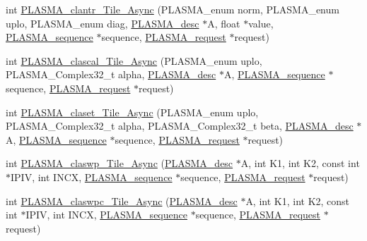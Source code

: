 \begin{DoxyCompactItemize}
\item 
int \hyperlink{group__PLASMA__Complex32__t__Tile__Async_gafc8c8736dbeea863cc6bfa87bec32049_gafc8c8736dbeea863cc6bfa87bec32049}{P\+L\+A\+S\+M\+A\+\_\+clantr\+\_\+\+Tile\+\_\+\+Async} (P\+L\+A\+S\+M\+A\+\_\+enum norm, P\+L\+A\+S\+M\+A\+\_\+enum uplo, P\+L\+A\+S\+M\+A\+\_\+enum diag, \hyperlink{structplasma__desc__t}{P\+L\+A\+S\+M\+A\+\_\+desc} $\ast$A, float $\ast$value, \hyperlink{structplasma__sequence__t}{P\+L\+A\+S\+M\+A\+\_\+sequence} $\ast$sequence, \hyperlink{structplasma__request__t}{P\+L\+A\+S\+M\+A\+\_\+request} $\ast$request)
\item 
int \hyperlink{group__PLASMA__Complex32__t__Tile__Async_ga72442cec5ef58786d99fad33fbbe789e_ga72442cec5ef58786d99fad33fbbe789e}{P\+L\+A\+S\+M\+A\+\_\+clascal\+\_\+\+Tile\+\_\+\+Async} (P\+L\+A\+S\+M\+A\+\_\+enum uplo, P\+L\+A\+S\+M\+A\+\_\+\+Complex32\+\_\+t alpha, \hyperlink{structplasma__desc__t}{P\+L\+A\+S\+M\+A\+\_\+desc} $\ast$A, \hyperlink{structplasma__sequence__t}{P\+L\+A\+S\+M\+A\+\_\+sequence} $\ast$sequence, \hyperlink{structplasma__request__t}{P\+L\+A\+S\+M\+A\+\_\+request} $\ast$request)
\item 
int \hyperlink{group__PLASMA__Complex32__t__Tile__Async_ga37fdc0526d96baa410a7346b11e383c6_ga37fdc0526d96baa410a7346b11e383c6}{P\+L\+A\+S\+M\+A\+\_\+claset\+\_\+\+Tile\+\_\+\+Async} (P\+L\+A\+S\+M\+A\+\_\+enum uplo, P\+L\+A\+S\+M\+A\+\_\+\+Complex32\+\_\+t alpha, P\+L\+A\+S\+M\+A\+\_\+\+Complex32\+\_\+t beta, \hyperlink{structplasma__desc__t}{P\+L\+A\+S\+M\+A\+\_\+desc} $\ast$A, \hyperlink{structplasma__sequence__t}{P\+L\+A\+S\+M\+A\+\_\+sequence} $\ast$sequence, \hyperlink{structplasma__request__t}{P\+L\+A\+S\+M\+A\+\_\+request} $\ast$request)
\item 
int \hyperlink{group__PLASMA__Complex32__t__Tile__Async_ga5ff56ce40aa2f76b6bdb382c723d8c17_ga5ff56ce40aa2f76b6bdb382c723d8c17}{P\+L\+A\+S\+M\+A\+\_\+claswp\+\_\+\+Tile\+\_\+\+Async} (\hyperlink{structplasma__desc__t}{P\+L\+A\+S\+M\+A\+\_\+desc} $\ast$A, int K1, int K2, const int $\ast$I\+P\+I\+V, int I\+N\+C\+X, \hyperlink{structplasma__sequence__t}{P\+L\+A\+S\+M\+A\+\_\+sequence} $\ast$sequence, \hyperlink{structplasma__request__t}{P\+L\+A\+S\+M\+A\+\_\+request} $\ast$request)
\item 
int \hyperlink{group__PLASMA__Complex32__t__Tile__Async_ga3d8daf3c399a7ad84bbd9738b304be54_ga3d8daf3c399a7ad84bbd9738b304be54}{P\+L\+A\+S\+M\+A\+\_\+claswpc\+\_\+\+Tile\+\_\+\+Async} (\hyperlink{structplasma__desc__t}{P\+L\+A\+S\+M\+A\+\_\+desc} $\ast$A, int K1, int K2, const int $\ast$I\+P\+I\+V, int I\+N\+C\+X, \hyperlink{structplasma__sequence__t}{P\+L\+A\+S\+M\+A\+\_\+sequence} $\ast$sequence, \hyperlink{structplasma__request__t}{P\+L\+A\+S\+M\+A\+\_\+request} $\ast$request)

\end{DoxyCompactItemize}
